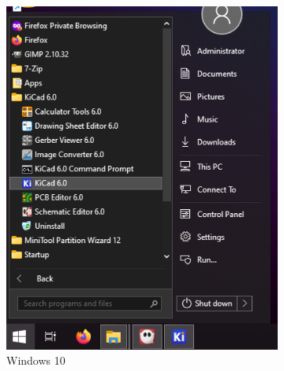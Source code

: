 \documentclass[12pt]{book}
\begin{document}
	\begin{figure}[!ht]
		\centering
		\begin{subfigure}[t]{0.4\textwidth}
			\includegraphics[width=\textwidth]{images/installations/kicad_menu_all}
			\caption{Windows 10}
		\end{subfigure}
		\begin{subfigure}[t]{0.4\textwidth}

\end{subfigure}
\end{figure}
\end{document}

